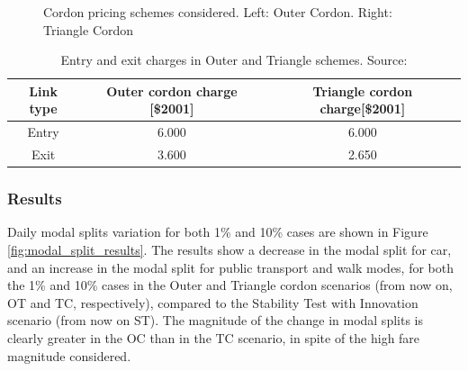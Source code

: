 \documentclass[Journal,letterpaper]{ascelike-new}
\begin{document}
\begin{figure}[h!]
	\caption{Cordon pricing schemes considered. Left: Outer Cordon. Right: Triangle Cordon}
	\label{fig:congestion_pricing_schemes}
\end{figure}

\begin{table}[h!]
	\centering
	\caption{Entry and exit charges in Outer and Triangle schemes. Source: \cite{gleave2009tarificacion}}
	\label{table:cordon_charges}
	\begin{tabular}{ccc}
		\hline
		Link type& Outer cordon charge {[}\$2001{]} & Triangle cordon charge{[}\$2001{]}\\
		\hline
		Entry & 6.000 & 6.000   \\
		Exit  & 3.600 & 2.650 \\
		\hline          
	\end{tabular}
\end{table}

\subsubsection{Results}

Daily modal splits variation for both 1\% and 10\% cases are shown in Figure \ref{fig:modal_split_results}. The results show a decrease in the modal split for car, and an increase in the modal split for public transport and walk modes, for both the 1\% and 10\% cases in the Outer and Triangle cordon scenarios (from now on, OT and TC, respectively), compared to the Stability Test with Innovation scenario (from now on ST). The magnitude of the change in modal splits is clearly greater in the OC than in the TC scenario, in spite of the high fare magnitude considered. 
\end{document}
